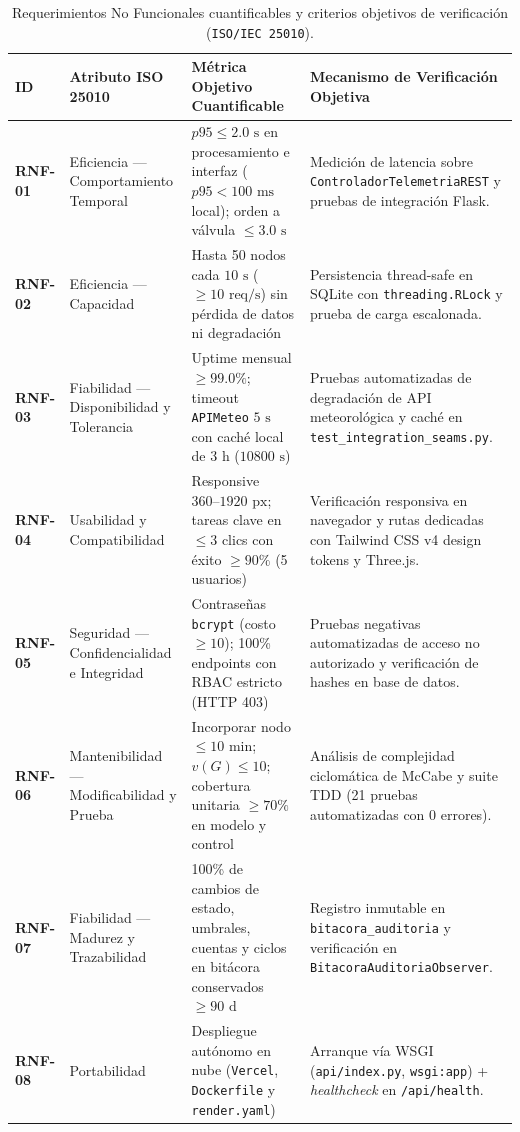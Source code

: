 \documentclass[11pt,letterpaper]{report}
\begin{document}
\begin{table}[H]
\centering
\caption{Requerimientos No Funcionales cuantificables y criterios objetivos de verificación (\texttt{ISO/IEC 25010}).}
\label{tab:rnf}
\small
\begin{tabularx}{\textwidth}{l L{3.2cm} L{4.1cm} Y}
\toprule
\textbf{ID} & \textbf{Atributo ISO 25010} & \textbf{Métrica Objetivo Cuantificable} & \textbf{Mecanismo de Verificación Objetiva} \\
\midrule
\textbf{RNF-01} & Eficiencia --- Comportamiento Temporal & $p95 \le 2.0\text{ s}$ en procesamiento e interfaz ($p95 < 100\text{ ms}$ local); orden a válvula $\le 3.0\text{ s}$ & Medición de latencia sobre \texttt{ControladorTelemetriaREST} y pruebas de integración Flask. \\
\textbf{RNF-02} & Eficiencia --- Capacidad & Hasta 50 nodos cada $10\text{ s}$ ($\ge 10\text{ req/s}$) sin pérdida de datos ni degradación & Persistencia thread-safe en SQLite con \texttt{threading.RLock} y prueba de carga escalonada. \\
\textbf{RNF-03} & Fiabilidad --- Disponibilidad y Tolerancia & Uptime mensual $\ge 99.0\%$; timeout \texttt{APIMeteo} $5\text{ s}$ con caché local de $3\text{ h}$ ($10800\text{ s}$) & Pruebas automatizadas de degradación de API meteorológica y caché en \texttt{test\_integration\_seams.py}. \\
\textbf{RNF-04} & Usabilidad y Compatibilidad & Responsive $360\text{--}1920\text{ px}$; tareas clave en $\le 3$ clics con éxito $\ge 90\%$ (5 usuarios) & Verificación responsiva en navegador y rutas dedicadas con Tailwind CSS v4 design tokens y Three.js. \\
\textbf{RNF-05} & Seguridad --- Confidencialidad e Integridad & Contraseñas \texttt{bcrypt} (costo $\ge 10$); 100\% endpoints con RBAC estricto (HTTP 403) & Pruebas negativas automatizadas de acceso no autorizado y verificación de hashes en base de datos. \\
\textbf{RNF-06} & Mantenibilidad --- Modificabilidad y Prueba & Incorporar nodo $\le 10\text{ min}$; $v(G) \le 10$; cobertura unitaria $\ge 70\%$ en modelo y control & Análisis de complejidad ciclomática de McCabe y suite TDD (21 pruebas automatizadas con 0 errores). \\
\textbf{RNF-07} & Fiabilidad --- Madurez y Trazabilidad & 100\% de cambios de estado, umbrales, cuentas y ciclos en bitácora conservados $\ge 90\text{ d}$ & Registro inmutable en \texttt{bitacora\_auditoria} y verificación en \texttt{BitacoraAuditoriaObserver}. \\
\textbf{RNF-08} & Portabilidad & Despliegue autónomo en nube (\texttt{Vercel}, \texttt{Dockerfile} y \texttt{render.yaml}) & Arranque vía WSGI (\texttt{api/index.py}, \texttt{wsgi:app}) + \textit{healthcheck} en \texttt{/api/health}. \\
\bottomrule
\end{tabularx}
\end{table}
\end{document}
